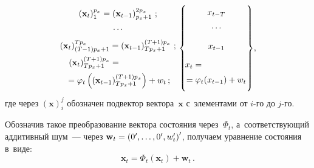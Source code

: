 \begin{multicols}{2}
\noindent
     \begin{equation*}
     \begin{matrix}
     \left( \mathbf{x}_t\right)_1^{p_x} =\left( \mathbf{x}_{t-
1}\right)^{2p_x}_{p_x+1}\,;\\[6pt]
     \cdots\\[6pt]
     \left( \mathbf{x}_t\right)^{Tp_x}_{(T-1)p_x+1} = \left( \mathbf{x}_{t-
1}\right)^{(T+1)p_x}_{Tp_x+1}\,;\\[6pt]
        \hspace*{-19mm} \left( \mathbf{x}_t\right)_{Tp_x+1}^{(T+1)p_x} ={}\\[6pt]
{} =\varphi_t\left( \left( 
\mathbf{x}_{t-1}\right)_{Tp_x+1}^{(T+1)p_x}\right)+w_t\,;
     \end{matrix}\,
     \left\{
     \vphantom{\begin{matrix}
     \left( \mathbf{x}_t\right)_1^{p_x} =\left( \mathbf{x}_{t-
1}\right)^{2p_x}_{p_x+1}\,;\\[6pt]
     \cdots\\[6pt]
     \left( \mathbf{x}_t\right)^{Tp_x}_{(T-1)p_x+1} = \left( \mathbf{x}_{t-
1}\right)^{(T+1)p_x}_{Tp_x+1}\,;\\[12pt]
        \hspace*{-19mm} \left( \mathbf{x}_t\right)_{Tp_x+1}^{(T+1)p_x} ={}\\[6pt]
{} =\varphi_t\left( \left( 
\mathbf{x}_{t-1}\right)_{Tp_x+1}^{(T+1)p_x}\right)+w_t\,,
     \end{matrix}}
          \begin{matrix}
          \\[-16pt]
     x_{t-T}\\[6pt]
      \cdots\\[10pt] 
      x_{t-1}\\[10pt]
    \hspace*{-19mm} x_t=\\[6pt]
     =\varphi_t( x_{t-1}) +w_t
     \end{matrix}
     \right\}\!,\hspace*{-0.7pt}
     \end{equation*}
где через $( \mathbf{x})_i^j$ обозна\-чен под\-век\-тор век\-то\-ра~$\mathbf{x}$ 
с~элементами от $i$-го до $j$-го.

     Обозначив такое преобразование век\-то\-ра со\-сто\-яния через~$\Phi_t$, 
а~со\-от\-вет\-ст\-ву\-ющий ад\-ди\-тив\-ный шум~--- через $\mathbf{w}_t\hm= \left( 
0^\prime, \ldots, 0^\prime, w_t^\prime\right)^\prime$, получаем урав\-не\-ние со\-сто\-яния 
в~\mbox{виде}:
     \begin{equation}
     \mathbf{x}_t=\Phi_t(\mathbf{x}_t) +\mathbf{w}_t\,.
     \label{e2-bos}
     \end{equation}
     

\end{multicols}
